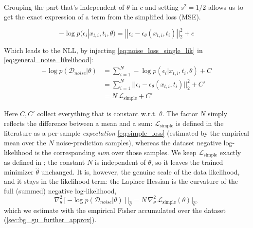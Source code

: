 Grouping the part that's independent of $\theta$ in $c$ and setting $s^2 = 1/2$ allows us to get the exact expression of a term from the simplified loss (\acs{MSE}).

\begin{equation}
-\log p (\epsilon_i | x_{t,i}, t_i, \theta) = ||\epsilon_i - \epsilon_\theta(x_{t,i}, t_i)||_2^2 + c \label{eq:noise_loss_single_lik}
\end{equation}

Which leads to the \acs{NLL}, by injecting \autoref{eq:noise_loss_single_lik} in \autoref{eq:general_noise_likelihood}:
\begin{align}
    - \log p(\mathcal{D}_{noise}|\theta) &= \sum^N_{i=1} - \log p(\epsilon_i|x_{t,i},t_i,\theta) + C\\
    &= \sum^N_{i=1} ||\epsilon_i - \epsilon_\theta(x_{t,i}, t_i)||_2^2 + C'\\
    &= N\,\mathcal{L}_{\mathrm{simple}} + C' \label{eq:nll_n_lsimple}
\end{align}

Here $C, C'$ collect everything that is constant w.r.t. $\theta$. The factor $N$ simply reflects the difference between a mean and a sum: $\mathcal{L}_{\mathrm{simple}}$ is defined in the literature as a per-sample \emph{expectation} \eqref{eq:simple_loss} (estimated by the empirical mean over the $N$ noise-prediction samples), whereas the dataset negative log-likelihood is the corresponding \emph{sum} over those samples. We keep $\mathcal{L}_{\mathrm{simple}}$ exactly as defined in \cite{ho_denoising_2020}; the constant $N$ is independent of $\theta$, so it leaves the trained minimizer $\hat\theta$ unchanged. It is, however, the genuine scale of the data likelihood, and it stays in the likelihood term: the Laplace Hessian is the curvature of the full (summed) negative log-likelihood,
\begin{equation}
\nabla^2_\theta\left[-\log p(\mathcal{D}_{noise}|\theta)\right]\big|_{\hat\theta} = N\,\nabla^2_\theta\,\mathcal{L}_{\mathrm{simple}}(\theta)\big|_{\hat\theta},
\label{eq:nll_hessian_scale}
\end{equation}
which we estimate with the empirical Fisher accumulated over the dataset (\autoref{sec:bg_gu_further_approx}). 



